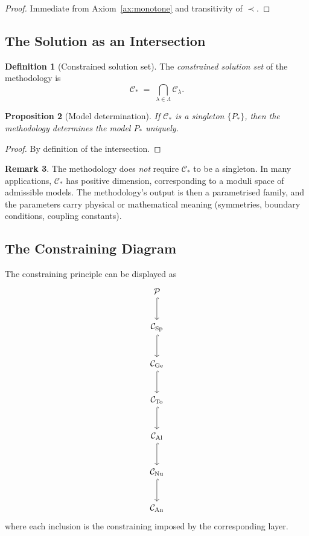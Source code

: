 \documentclass[11pt,a4paper]{article}
\theoremstyle{definition}
\newtheorem{definition}{Definition}[section]
\newtheorem{remark}[definition]{Remark}
\theoremstyle{plain}
\newtheorem{proposition}[definition]{Proposition}
\newcommand{\Lam}{\Lambda}
\newcommand{\Sp}{\mathrm{Sp}}
\newcommand{\Ge}{\mathrm{Ge}}
\newcommand{\To}{\mathrm{To}}
\newcommand{\Al}{\mathrm{Al}}
\newcommand{\Nu}{\mathrm{Nu}}
\newcommand{\An}{\mathrm{An}}
\newcommand{\Ccal}{\mathcal{C}}
\begin{document}
\begin{proof}
Immediate from Axiom~\ref{ax:monotone} and transitivity of $\prec$.
\end{proof}

\subsection{The Solution as an Intersection}

\begin{definition}[Constrained solution set]\label{def:sol-set}
The \emph{constrained solution set} of the methodology is
\[
  \Ccal_\ast
  \;=\;
  \bigcap_{\lambda \in \Lam} \Ccal_\lambda .
\]
\end{definition}

\begin{proposition}[Model determination]\label{prop:determination}
If $\Ccal_\ast$ is a singleton $\{P_\ast\}$, then the methodology
\emph{determines} the model $P_\ast$ uniquely.
\end{proposition}

\begin{proof}
By definition of the intersection.
\end{proof}

\begin{remark}
The methodology does \emph{not} require $\Ccal_\ast$ to be a
singleton. In many applications, $\Ccal_\ast$ has positive
dimension, corresponding to a moduli space of admissible models.
The methodology's output is then a parametrised family, and the
parameters carry physical or mathematical meaning (symmetries,
boundary conditions, coupling constants).
\end{remark}

\subsection{The Constraining Diagram}

The constraining principle can be displayed as
\begin{equation}\label{eq:constraining-diagram}
\begin{tikzcd}[row sep=large, column sep=large]
  \mathcal P \arrow[d, hookrightarrow] \\
  \Ccal_\Sp \arrow[d, hookrightarrow] \\
  \Ccal_\Ge \arrow[d, hookrightarrow] \\
  \Ccal_\To \arrow[d, hookrightarrow] \\
  \Ccal_\Al \arrow[d, hookrightarrow] \\
  \Ccal_\Nu \arrow[d, hookrightarrow] \\
  \Ccal_\An
\end{tikzcd}
\end{equation}
where each inclusion is the constraining imposed by the corresponding
layer.
\end{document}

